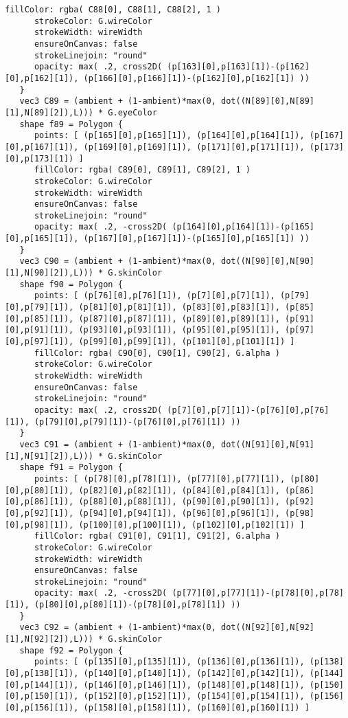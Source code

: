 \begin{lstlisting}[language=Sty-RT,escapechar=@]
      fillColor: rgba( C88[0], C88[1], C88[2], 1 )
      strokeColor: G.wireColor
      strokeWidth: wireWidth
      ensureOnCanvas: false
      strokeLinejoin: "round"
      opacity: max( .2, cross2D( (p[163][0],p[163][1])-(p[162][0],p[162][1]), (p[166][0],p[166][1])-(p[162][0],p[162][1]) ))
   }
   vec3 C89 = (ambient + (1-ambient)*max(0, dot((N[89][0],N[89][1],N[89][2]),L))) * G.eyeColor
   shape f89 = Polygon {
      points: [ (p[165][0],p[165][1]), (p[164][0],p[164][1]), (p[167][0],p[167][1]), (p[169][0],p[169][1]), (p[171][0],p[171][1]), (p[173][0],p[173][1]) ]
      fillColor: rgba( C89[0], C89[1], C89[2], 1 )
      strokeColor: G.wireColor
      strokeWidth: wireWidth
      ensureOnCanvas: false
      strokeLinejoin: "round"
      opacity: max( .2, -cross2D( (p[164][0],p[164][1])-(p[165][0],p[165][1]), (p[167][0],p[167][1])-(p[165][0],p[165][1]) ))
   }
   vec3 C90 = (ambient + (1-ambient)*max(0, dot((N[90][0],N[90][1],N[90][2]),L))) * G.skinColor
   shape f90 = Polygon {
      points: [ (p[76][0],p[76][1]), (p[7][0],p[7][1]), (p[79][0],p[79][1]), (p[81][0],p[81][1]), (p[83][0],p[83][1]), (p[85][0],p[85][1]), (p[87][0],p[87][1]), (p[89][0],p[89][1]), (p[91][0],p[91][1]), (p[93][0],p[93][1]), (p[95][0],p[95][1]), (p[97][0],p[97][1]), (p[99][0],p[99][1]), (p[101][0],p[101][1]) ]
      fillColor: rgba( C90[0], C90[1], C90[2], G.alpha )
      strokeColor: G.wireColor
      strokeWidth: wireWidth
      ensureOnCanvas: false
      strokeLinejoin: "round"
      opacity: max( .2, cross2D( (p[7][0],p[7][1])-(p[76][0],p[76][1]), (p[79][0],p[79][1])-(p[76][0],p[76][1]) ))
   }
   vec3 C91 = (ambient + (1-ambient)*max(0, dot((N[91][0],N[91][1],N[91][2]),L))) * G.skinColor
   shape f91 = Polygon {
      points: [ (p[78][0],p[78][1]), (p[77][0],p[77][1]), (p[80][0],p[80][1]), (p[82][0],p[82][1]), (p[84][0],p[84][1]), (p[86][0],p[86][1]), (p[88][0],p[88][1]), (p[90][0],p[90][1]), (p[92][0],p[92][1]), (p[94][0],p[94][1]), (p[96][0],p[96][1]), (p[98][0],p[98][1]), (p[100][0],p[100][1]), (p[102][0],p[102][1]) ]
      fillColor: rgba( C91[0], C91[1], C91[2], G.alpha )
      strokeColor: G.wireColor
      strokeWidth: wireWidth
      ensureOnCanvas: false
      strokeLinejoin: "round"
      opacity: max( .2, -cross2D( (p[77][0],p[77][1])-(p[78][0],p[78][1]), (p[80][0],p[80][1])-(p[78][0],p[78][1]) ))
   }
   vec3 C92 = (ambient + (1-ambient)*max(0, dot((N[92][0],N[92][1],N[92][2]),L))) * G.skinColor
   shape f92 = Polygon {
      points: [ (p[135][0],p[135][1]), (p[136][0],p[136][1]), (p[138][0],p[138][1]), (p[140][0],p[140][1]), (p[142][0],p[142][1]), (p[144][0],p[144][1]), (p[146][0],p[146][1]), (p[148][0],p[148][1]), (p[150][0],p[150][1]), (p[152][0],p[152][1]), (p[154][0],p[154][1]), (p[156][0],p[156][1]), (p[158][0],p[158][1]), (p[160][0],p[160][1]) ]

\end{lstlisting}
